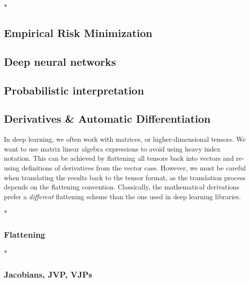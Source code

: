 \switchcolumn[1]*
\switchcolumn[0]

\subsection{Empirical Risk Minimization}


\switchcolumn[1]
\switchcolumn[0]

\subsection{Deep neural networks}


\subsection{Probabilistic interpretation}


\subsection{Derivatives \& Automatic Differentiation}

\begin{caveat}
  In deep learning, we often work with matrices, or higher-dimensional tensors.
  We want to use matrix linear algebra expressions to avoid using heavy index notation.
  This can be achieved by flattening all tensors back into vectors and re-using definitions of derivatives from the vector case.
  However, we must be careful when translating the results back to the tensor format, as the translation process depends on the flattening convention.
  Classically, the mathematical derivations prefer a \emph{different} flattening scheme than the one used in deep learning libraries.
\end{caveat}

\switchcolumn[0]*
\subsubsection{Flattening}


\switchcolumn[0]*
\subsubsection{Jacobians, JVP, VJPs}


